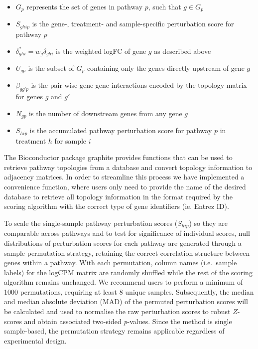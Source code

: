 \documentclass[9pt,a4paper,]{extarticle}
\begin{document}
\begin{itemize}
\item
  \(G_p\) represents the set of genes in pathway \(p\), such that \(g \in G_p\)
\item
  \(S_{ghip}\) is the gene-, treatment- and sample-specific perturbation score for pathway \(p\)
\item
  \(\delta_{ghi}^* = w_g\delta_{ghi}\) is the weighted logFC of gene \(g\) as described above
\item
  \(U_{gp}\) is the subset of \(G_p\) containing only the genes directly upstream of gene \(g\)
\item
  \(\beta_{gg'p}\) is the pair-wise gene-gene interactions\citep{Tarca2009} encoded by the topology matrix for genes \(g\) and \(g'\)
\item
  \(N_{gp}\) is the number of downstream genes from any gene \(g\)
\item
  \(S_{hip}\) is the accumulated pathway perturbation score for pathway \(p\) in treatment \(h\) for sample \(i\)
\end{itemize}

The Bioconductor package graphite\citep{Sales2012} provides functions that can be used to retrieve pathway topologies from a database and convert topology information to adjacency matrices.
In order to streamline this process we have implemented a convenience function, where users only need to provide the name of the desired database to retrieve all topology information in the format required by the scoring algorithm with the correct type of gene identifiers (ie. Entrez ID).

To scale the single-sample pathway perturbation scores (\(S_{hip}\)) so they are comparable across pathways and to test for significance of individual scores, null distributions of perturbation scores for each pathway are generated through a sample permutation strategy, retaining the correct correlation structure between genes within a pathway.
With each permutation, column names (i.e.~sample labels) for the logCPM matrix are randomly shuffled while the rest of the scoring algorithm remains unchanged.
We recommend users to perform a minimum of 1000 permutations, requiring at least 8 unique samples.
Subsequently, the median and median absolute deviation (MAD) of the permuted perturbation scores will be calculated and used to normalise the raw perturbation scores to robust \(Z\)-scores and obtain associated two-sided \emph{p}-values.
Since the method is single sample-based, the permutation strategy remains applicable regardless of experimental design.
\end{document}
